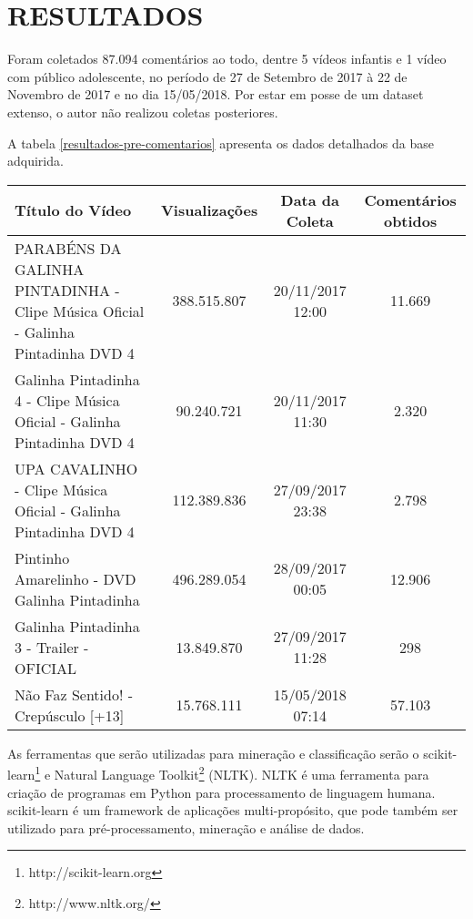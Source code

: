 \section{RESULTADOS}

Foram coletados 87.094 comentários ao todo, dentre 5 vídeos infantis e 1 vídeo com público adolescente, no período de 27 de Setembro de 2017 à 22 de Novembro de 2017 e no dia 15/05/2018. Por estar em posse de um dataset extenso, o autor não realizou coletas posteriores. 

A tabela \ref{resultados-pre-comentarios} apresenta os dados detalhados da base adquirida.

\begin{table}[H]
	
\begin{tabular}{|p{5.5cm}|c|c|c|}
\hline
\textbf{Título do Vídeo} & \textbf{Visualizações} & \textbf{Data da Coleta} & \textbf{Comentários obtidos} \\ \hline
PARABÉNS DA GALINHA PINTADINHA - Clipe Música Oficial - Galinha Pintadinha DVD 4 & 388.515.807 & 20/11/2017 12:00 & 11.669 \\ \hline
Galinha Pintadinha 4 - Clipe Música Oficial - Galinha Pintadinha DVD 4 & 90.240.721 & 20/11/2017 11:30 & 2.320 \\ \hline
UPA CAVALINHO - Clipe Música Oficial - Galinha Pintadinha DVD 4 & 112.389.836 & 27/09/2017 23:38 & 2.798 \\ \hline
Pintinho Amarelinho - DVD Galinha Pintadinha & 496.289.054 & 28/09/2017 00:05 & 12.906 \\ \hline
Galinha Pintadinha 3 - Trailer - OFICIAL & 13.849.870 & 27/09/2017 11:28 & 298 \\ \hline
Não Faz Sentido! - Crepúsculo [+13] & 15.768.111 & 15/05/2018 07:14 & 57.103 \\ \hline
\end{tabular}

\end{table}


As ferramentas que serão utilizadas para mineração e classificação serão o scikit-learn\footnote{http://scikit-learn.org} e Natural Language Toolkit\footnote{http://www.nltk.org/} (NLTK). NLTK é uma ferramenta para criação de programas em Python para processamento de linguagem humana. scikit-learn é um framework de aplicações multi-propósito, que pode também ser utilizado para pré-processamento, mineração e análise de dados. 

